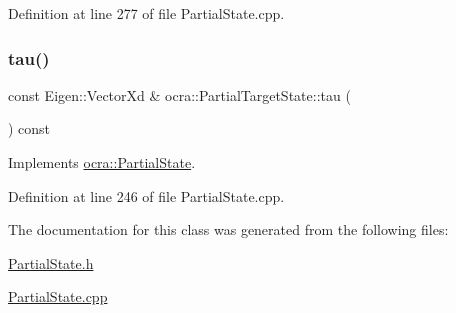 Definition at line 277 of file Partial\+State.\+cpp.

\hypertarget{classocra_1_1PartialTargetState_ac76855da54cf77b63bdbd7ecdb6ef57d}{}\label{classocra_1_1PartialTargetState_ac76855da54cf77b63bdbd7ecdb6ef57d} 
\subsubsection{\texorpdfstring{tau()}{tau()}}
{\footnotesize\ttfamily const Eigen\+::\+Vector\+Xd \& ocra\+::\+Partial\+Target\+State\+::tau (\begin{DoxyParamCaption}{ }\end{DoxyParamCaption}) const\hspace{0.3cm}{\ttfamily [virtual]}}



Implements \hyperlink{classocra_1_1PartialState_a875575d215c7fe9278d47ff6f392bb84}{ocra\+::\+Partial\+State}.



Definition at line 246 of file Partial\+State.\+cpp.



The documentation for this class was generated from the following files\+:\begin{DoxyCompactItemize}
\item 
\hyperlink{PartialState_8h}{Partial\+State.\+h}\item 
\hyperlink{PartialState_8cpp}{Partial\+State.\+cpp}\end{DoxyCompactItemize}
